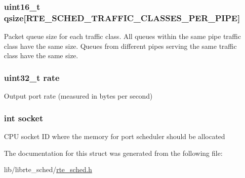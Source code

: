 \subsubsection[{qsize}]{\setlength{\rightskip}{0pt plus 5cm}uint16\+\_\+t qsize\mbox{[}{\bf R\+T\+E\+\_\+\+S\+C\+H\+E\+D\+\_\+\+T\+R\+A\+F\+F\+I\+C\+\_\+\+C\+L\+A\+S\+S\+E\+S\+\_\+\+P\+E\+R\+\_\+\+P\+I\+P\+E}\mbox{]}}\label{structrte__sched__port__params_a98277794202bfdf78db8bca71abaa98c}
Packet queue size for each traffic class. All queues within the same pipe traffic class have the same size. Queues from different pipes serving the same traffic class have the same size. \hypertarget{structrte__sched__port__params_a82e0b1311e54c51fa587134c4f9bad50}{}
\subsubsection[{rate}]{\setlength{\rightskip}{0pt plus 5cm}uint32\+\_\+t rate}\label{structrte__sched__port__params_a82e0b1311e54c51fa587134c4f9bad50}
Output port rate (measured in bytes per second) \hypertarget{structrte__sched__port__params_a3666576f6b88007cc7b8f26c7da596c8}{}
\subsubsection[{socket}]{\setlength{\rightskip}{0pt plus 5cm}int socket}\label{structrte__sched__port__params_a3666576f6b88007cc7b8f26c7da596c8}
C\+P\+U socket I\+D where the memory for port scheduler should be allocated 

The documentation for this struct was generated from the following file\+:\begin{DoxyCompactItemize}
\item 
lib/librte\+\_\+sched/\hyperlink{rte__sched_8h}{rte\+\_\+sched.\+h}\end{DoxyCompactItemize}
